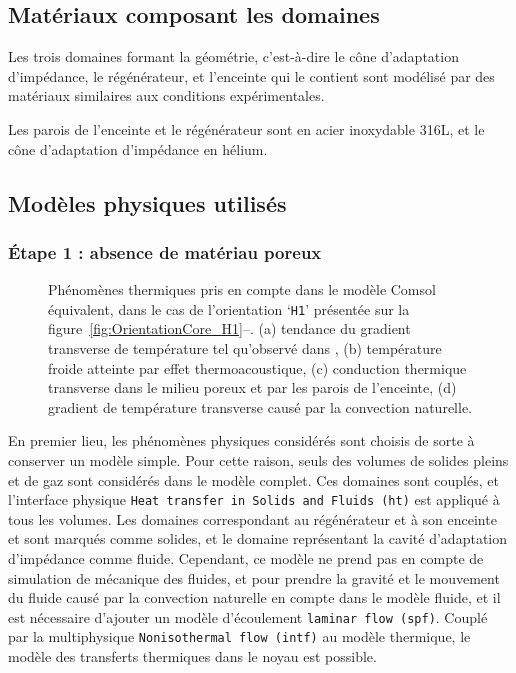 \subsection{Matériaux composant les domaines}
Les trois domaines formant la géométrie, c'est-à-dire le cône d'adaptation d'impédance, le régénérateur, et l'enceinte qui le contient sont modélisé par des matériaux similaires aux conditions expérimentales. 

Les parois de l'enceinte et le régénérateur sont en acier inoxydable 316L, et le cône d'adaptation d'impédance en hélium.

\subsection{Modèles physiques utilisés}
\subsubsection{\'Etape 1 : absence de matériau poreux}
\begin{figure}[!ht]
    \centering
    
    \caption{Phénomènes thermiques pris en compte dans le modèle Comsol équivalent, dans le cas de l'orientation `\texttt{H1}' présentée sur la figure~\ref{fig:OrientationCore_H1}--. (a) tendance du gradient transverse de température tel qu'observé dans \cite{ramadan_design_2021}, (b) température froide atteinte par effet thermoacoustique, (c) conduction thermique transverse dans le milieu poreux et par les parois de l'enceinte, (d) gradient de température transverse causé par la convection naturelle.}
    \label{fig:SuperpositionComsol}
\end{figure}

En premier lieu, les phénomènes physiques considérés sont choisis de sorte à conserver un modèle simple. Pour cette raison, seuls des volumes  de solides pleins et de gaz sont considérés dans le modèle complet. Ces domaines sont couplés, et l'interface physique \texttt{Heat transfer in Solids and Fluids (ht)} est appliqué à tous les volumes. Les domaines correspondant au régénérateur et à son enceinte et sont marqués comme solides, et le domaine représentant la cavité d'adaptation d'impédance comme fluide. Cependant, ce modèle ne prend pas en compte de simulation de mécanique des fluides, et pour prendre la gravité et le mouvement du fluide causé par la convection naturelle en compte dans le modèle fluide, et il est nécessaire d'ajouter un modèle d'écoulement \texttt{laminar flow (spf)}. Couplé par la multiphysique \texttt{Nonisothermal flow (intf)} au modèle thermique, le modèle des transferts thermiques dans le noyau est possible.   

